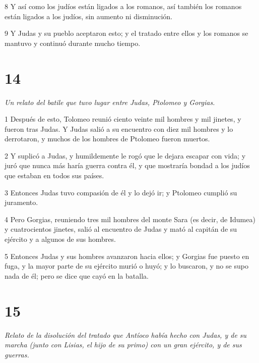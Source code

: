 \par 8 Y así como los judíos están ligados a los romanos, así también los romanos están ligados a los judíos, sin aumento ni disminución.

\par 9 Y Judas y su pueblo aceptaron esto; y el tratado entre ellos y los romanos se mantuvo y continuó durante mucho tiempo.

\chapter{14}

\par \textit{Un relato del batile que tuvo lugar entre Judas, Ptolomeo y Gorgias.}

\par 1 Después de esto, Tolomeo reunió ciento veinte mil hombres y mil jinetes, y fueron tras Judas. Y Judas salió a su encuentro con diez mil hombres y lo derrotaron, y muchos de los hombres de Ptolomeo fueron muertos.

\par 2 Y suplicó a Judas, y humildemente le rogó que le dejara escapar con vida; y juró que nunca más haría guerra contra él, y que mostraría bondad a los judíos que estaban en todos sus países.

\par 3 Entonces Judas tuvo compasión de él y lo dejó ir; y Ptolomeo cumplió su juramento.

\par 4 Pero Gorgias, reuniendo tres mil hombres del monte Sara (es decir, de Idumea) y cuatrocientos jinetes, salió al encuentro de Judas y mató al capitán de su ejército y a algunos de sus hombres.

\par 5 Entonces Judas y sus hombres avanzaron hacia ellos; y Gorgias fue puesto en fuga, y la mayor parte de su ejército murió o huyó; y lo buscaron, y no se supo nada de él; pero se dice que cayó en la batalla.

\chapter{15}

\par \textit{Relato de la disolución del tratado que Antíoco había hecho con Judas, y de su marcha (junto con Lisias, el hijo de su primo) con un gran ejército, y de sus guerras.}

